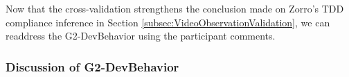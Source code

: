 Now that the cross-validation strengthens the conclusion made 
on Zorro's TDD compliance inference in Section \ref{subsec:VideoObservationValidation},
we can readdress the G2-DevBehavior using the participant
comments.

\subsubsection{Discussion of G2-DevBehavior}

